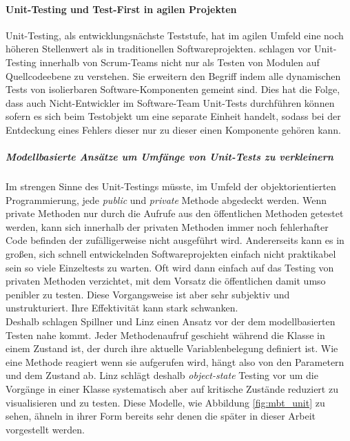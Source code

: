 \paragraph{Unit-Testing und Test-First in agilen Projekten}   
Unit-Testing, als entwicklungsnächste Teststufe, hat im agilen Umfeld eine noch höheren Stellenwert als in traditionellen Softwareprojekten. \citeauthor{spillner_software_2014} schlagen vor Unit-Testing innerhalb von Scrum-Teams nicht nur als Testen von Modulen auf Quellcodeebene zu verstehen. Sie erweitern den Begriff indem alle dynamischen Tests von isolierbaren Software-Komponenten gemeint sind. Dies hat die Folge, dass auch Nicht-Entwickler im Software-Team Unit-Tests durchführen können sofern es sich beim Testobjekt um eine separate Einheit handelt, sodass bei der Entdeckung eines Fehlers dieser nur zu dieser einen Komponente gehören kann.\\

\subparagraph{Modellbasierte Ansätze um Umfänge von Unit-Tests zu verkleinern}
Im strengen Sinne des Unit-Testings müsste, im Umfeld der objektorientierten Programmierung, jede \textit{public} und \textit{private} Methode abgedeckt werden. Wenn private Methoden nur durch die Aufrufe aus den öffentlichen Methoden getestet werden, kann sich innerhalb der privaten Methoden immer noch fehlerhafter Code befinden der zufälligerweise nicht ausgeführt wird. Andererseits kann es in großen, sich schnell entwickelnden Softwareprojekten einfach nicht praktikabel sein so viele Einzeltests zu warten. Oft wird dann einfach auf das Testing von privaten Methoden verzichtet, mit dem Vorsatz die öffentlichen damit umso penibler zu testen. Diese Vorgangsweise ist aber sehr subjektiv und unstrukturiert. Ihre Effektivität kann stark schwanken.\\
Deshalb schlagen Spillner und Linz einen Ansatz vor der dem modellbasierten Testen nahe kommt. Jeder Methodenaufruf geschieht während die Klasse in einem Zustand ist, der durch ihre aktuelle Variablenbelegung definiert ist. Wie eine Methode reagiert wenn sie aufgerufen wird, hängt also von den Parametern und dem Zustand ab. Linz schlägt deshalb \textit{object-state} Testing vor um die Vorgänge in einer Klasse systematisch aber auf kritische Zustände reduziert zu visualisieren und zu testen. Diese Modelle, wie Abbildung \ref{fig:mbt_unit} zu sehen, ähneln in ihrer Form bereits sehr denen die später in dieser Arbeit vorgestellt werden.

